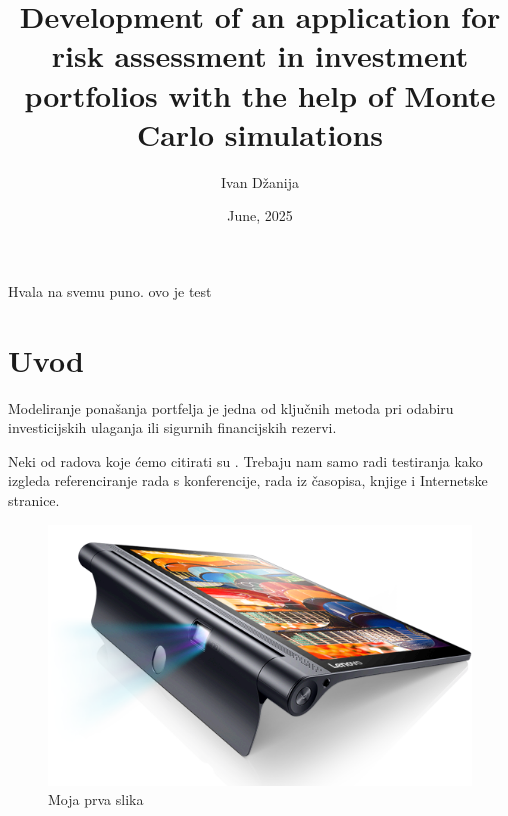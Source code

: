 \documentclass[zavrsnirad]{fer}
\title{Development of an application for risk assessment in investment portfolios with the help of Monte Carlo simulations}
\author{Ivan Džanija}
\date{June, 2025}
\begin{document}
\maketitle




\begin{zahvale}
  Hvala na svemu puno.
    ovo je test
\end{zahvale}

\mainmatter

\tableofcontents

\chapter{Uvod}
\label{pog:uvod}

Modeliranje ponašanja portfelja je jedna od ključnih metoda pri odabiru
investicijskih ulaganja ili sigurnih financijskih rezervi.

Neki od radova koje ćemo citirati su \cite{1,2,6248073,6247753,ghiglia_pritt_phase_unwrapping,4250461}.
Trebaju nam samo radi testiranja kako izgleda referenciranje rada s konferencije, rada iz časopisa, knjige i Internetske stranice.

\begin{figure}[htb]
  \centering
  \includegraphics[width=0.38\linewidth]{Figures/lenovo_yoga_tab3_pro_front.png}
  \caption{Moja prva slika}
  \label{slk:prvaslika}
\end{figure}
\end{document}
